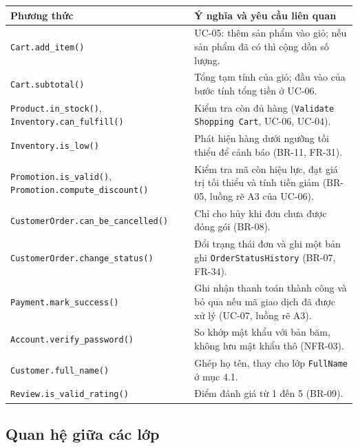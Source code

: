 \documentclass[12pt,a4paper,oneside]{report}
\begin{document}
\begin{longtable}{p{4.6cm}p{11.2cm}}
\toprule
\textbf{Phương thức} & \textbf{Ý nghĩa và yêu cầu liên quan} \\
\midrule
\endhead
\bottomrule
\endlastfoot
\texttt{Cart.add\_item()} & UC-05: thêm sản phẩm vào giỏ; nếu sản phẩm đã có thì cộng dồn số lượng. \\
\texttt{Cart.subtotal()} & Tổng tạm tính của giỏ; đầu vào của bước tính tổng tiền ở UC-06. \\
\texttt{Product.in\_stock()}, \texttt{Inventory.can\_fulfill()} & Kiểm tra còn đủ hàng (\texttt{Validate Shopping Cart}, UC-06, UC-04). \\
\texttt{Inventory.is\_low()} & Phát hiện hàng dưới ngưỡng tối thiểu để cảnh báo (BR-11, FR-31). \\
\texttt{Promotion.is\_valid()}, \texttt{Promotion.compute\_discount()} & Kiểm tra mã còn hiệu lực, đạt giá trị tối thiểu và tính tiền giảm (BR-05, luồng rẽ A3 của UC-06). \\
\texttt{CustomerOrder.can\_be\_cancelled()} & Chỉ cho hủy khi đơn chưa được đóng gói (BR-08). \\
\texttt{CustomerOrder.change\_status()} & Đổi trạng thái đơn và ghi một bản ghi \texttt{OrderStatusHistory} (BR-07, FR-34). \\
\texttt{Payment.mark\_success()} & Ghi nhận thanh toán thành công và bỏ qua nếu mã giao dịch đã được xử lý (UC-07, luồng rẽ A3). \\
\texttt{Account.verify\_password()} & So khớp mật khẩu với bản băm, không lưu mật khẩu thô (NFR-03). \\
\texttt{Customer.full\_name()} & Ghép họ tên, thay cho lớp \texttt{FullName} ở mục 4.1. \\
\texttt{Review.is\_valid\_rating()} & Điểm đánh giá từ 1 đến 5 (BR-09). \\
\end{longtable}

\subsection{Quan hệ giữa các lớp}
\end{document}
